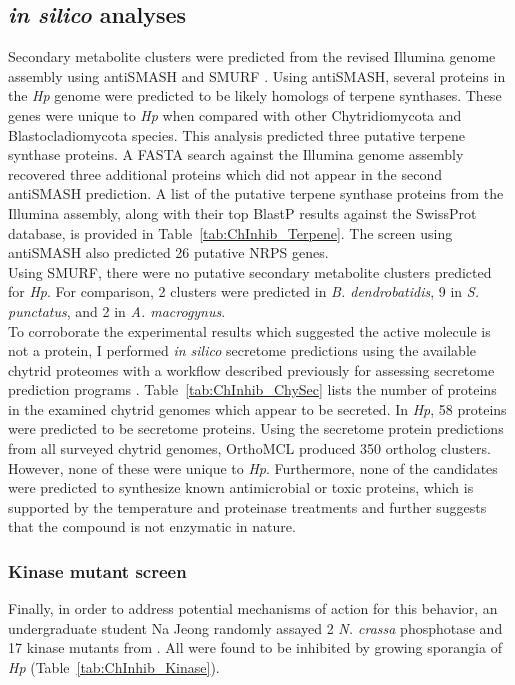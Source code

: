 \subsection*{\textit{in silico} analyses}
Secondary metabolite clusters were predicted from the revised Illumina genome assembly using antiSMASH \cite{Blin2013} and SMURF \cite{Khaldi2010}. Using antiSMASH, several proteins in the \textit{Hp} genome were predicted to be likely homologs of terpene synthases. These genes were unique to \textit{Hp} when compared with other Chytridiomycota and Blastocladiomycota species. This analysis predicted three putative terpene synthase proteins. A FASTA search against the Illumina genome assembly recovered three additional proteins which did not appear in the second antiSMASH prediction. A list of the putative terpene synthase proteins from the Illumina assembly, along with their top BlastP results against the SwissProt database, is provided in Table~\ref{tab:ChInhib_Terpene}. The screen using antiSMASH also predicted 26 putative NRPS genes. \\
\indent Using SMURF, there were no putative secondary metabolite clusters predicted for \textit{Hp}. For comparison, 2 clusters were predicted in \textit{B. dendrobatidis}, 9 in \textit{S. punctatus}, and 2 in \textit{A. macrogynus}.\\
\indent To corroborate the experimental results which suggested the active molecule is not a protein, I performed \textit{in silico} secretome predictions using the available chytrid proteomes with a workflow described previously for assessing secretome prediction programs \cite{Min2010}. Table~\ref{tab:ChInhib_ChySec} lists the number of proteins in the examined chytrid genomes which appear to be secreted. In \textit{Hp}, 58 proteins were predicted to be secretome proteins. Using the secretome protein predictions from all surveyed chytrid genomes, OrthoMCL produced 350 ortholog clusters. However, none of these were unique to \textit{Hp}. Furthermore, none of the candidates were predicted to synthesize known antimicrobial or toxic proteins, which is supported by the temperature and proteinase treatments and further suggests that the compound is not enzymatic in nature.\\
\subsubsection*{Kinase mutant screen}
Finally, in order to address potential mechanisms of action for this behavior, an undergraduate student Na Jeong randomly assayed 2 \textit{N. crassa} phosphotase and 17 kinase mutants from \cite{Park2011}. All were found to be inhibited by growing sporangia of \textit{Hp} (Table~\ref{tab:ChInhib_Kinase}).\\


